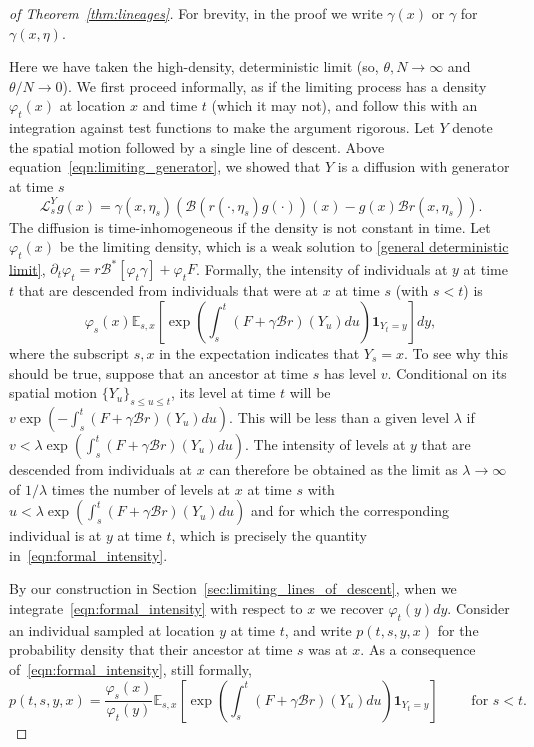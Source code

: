 \documentclass[EJP]{ejpecp} %
\newcommand{\IE}{\mathbb E}
\newcommand{\ind}{\mathbf{1}}
\newcommand{\DG}{\mathcal{B}}  %
\begin{document}
\begin{proof}[of Theorem~\ref{thm:lineages}]
For brevity, in the proof we write $\gamma(x)$ or $\gamma$ for $\gamma(x,\eta)$.

Here we have taken the high-density, deterministic limit
(so, $\theta, N \to \infty$ and $\theta/N \to 0$).
We first proceed informally,
as if the limiting process has a density $\varphi_t(x)$ at location $x$ and time $t$ (which it may not),
and follow this with an integration against test functions to make the argument rigorous.
Let $Y$ denote the spatial motion followed by a single line of descent.
Above equation~\eqref{eqn:limiting_generator},
we showed that $Y$ is a diffusion with generator at time $s$
$$
    \mathcal{L}^Y_s g(x) = \gamma(x,\eta_s) ( \DG(r(\cdot,\eta_s) g(\cdot))(x) - g(x) \DG r(x,\eta_s) ) .
$$
The diffusion is time-inhomogeneous if the density is not constant in time.
Let $\varphi_t(x)$ be the limiting density,
which is a weak solution to \eqref{general deterministic limit},
$\partial_t \varphi_t = r \DG^*[ \varphi_t \gamma ] + \varphi_t F$.
Formally, the intensity of individuals at $y$ at time $t$
that are descended from individuals that were at $x$ at time $s$
(with $s < t$) is
\begin{equation} \label{eqn:formal_intensity}
    \varphi_s(x) \IE_{s,x} \left[
        \exp\left(
            \int_s^t (F + \gamma \DG r)(Y_u) du
        \right)
        \ind_{Y_t = y}
    \right]
    dy ,
\end{equation}
where the subscript $s, x$ in the expectation indicates that $Y_s = x$.
To see why this should be true, 
suppose that an ancestor at time $s$ has level $v$. Conditional on its 
spatial motion $\{Y_u\}_{s\leq u\leq t}$, its level at time $t$ will
be $v \exp(-\int_s^t(F+\gamma\DG r)(Y_u)du)$. This will be less than a given level 
$\lambda$ if $v < \lambda \exp(\int_s^t(F+\gamma\DG r)(Y_u)du)$. 
The intensity of levels at $y$ that are descended from individuals at
$x$ can therefore be obtained as the limit as $\lambda\to\infty$ of 
$1/\lambda$ times the number of levels at $x$ at time $s$ with
$u<\lambda \exp(\int_s^t(F+\gamma\DG r)(Y_u)du)$ and for which
the corresponding individual is at $y$ at time $t$, which is 
precisely the quantity in~\eqref{eqn:formal_intensity}. 

By our construction in Section~\ref{sec:limiting_lines_of_descent},
when we integrate~\eqref{eqn:formal_intensity}
with respect to $x$ we recover $\varphi_t(y)dy$. 
Consider an individual sampled at location $y$ at time $t$,
and write $p(t,s,y,x)$ for the probability density
that their ancestor at time $s$ was at $x$.
As a consequence of~\eqref{eqn:formal_intensity},
still formally,
\begin{equation}
\label{eqn:ptsyx}
    p(t,s,y,x)
    =
    \frac{\varphi_s(x)}{\varphi_t(y)}
    \IE_{s,x}\left[
        \exp\left( \int_s^t (F + \gamma\DG r)(Y_u) du \right)
        \ind_{Y_t=y}
    \right]
\qquad \text{ for } s < t.
\end{equation}


\end{proof}
\end{document}
